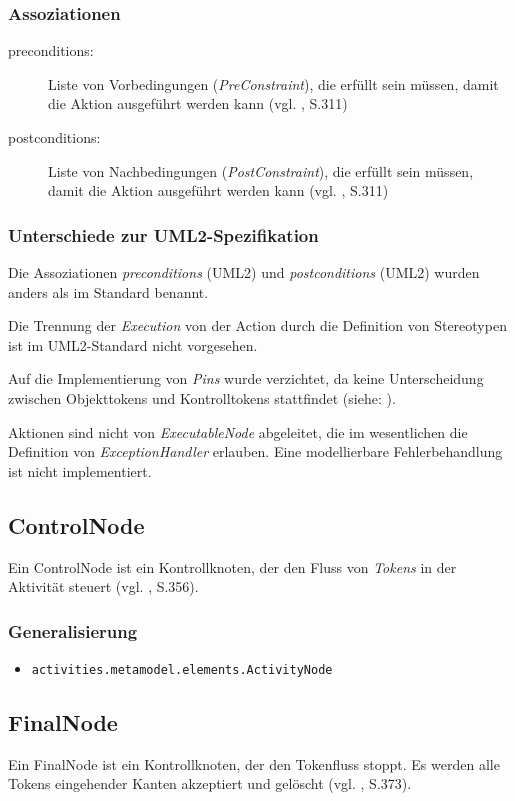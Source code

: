 \subsubsection{Assoziationen}
\begin{description}
\item[preconditions:] Liste von Vorbedingungen (\emph{PreConstraint}), die erfüllt sein müssen, damit die Aktion ausgeführt werden kann (vgl. \citep{OMG2009}, S.311)
\item[postconditions:] Liste von Nachbedingungen (\emph{PostConstraint}), die erfüllt sein müssen, damit  die Aktion ausgeführt werden kann (vgl. \citep{OMG2009}, S.311)
\end{description}

\subsubsection{Unterschiede zur UML2-Spezifikation}
Die Assoziationen \emph{preconditions} (UML2) und \emph{postconditions} (UML2) wurden anders als im Standard benannt.

Die Trennung der \emph{Execution} von der Action durch die Definition von Stereotypen ist im UML2-Standard nicht vorgesehen.

Auf die Implementierung von \emph{Pins} wurde verzichtet, da keine Unterscheidung zwischen Objekttokens und Kontrolltokens stattfindet (siehe: ).

Aktionen sind nicht von \emph{ExecutableNode} abgeleitet, die im wesentlichen die Definition von \emph{ExceptionHandler} erlauben. Eine modellierbare Fehlerbehandlung ist nicht implementiert.


\subsection{ControlNode}
Ein ControlNode ist ein Kontrollknoten, der den Fluss von \emph{Tokens} in der Aktivität steuert (vgl. \citep{OMG2009}, S.356).

\subsubsection{Generalisierung}
\begin{itemize}
\item \texttt{activities.metamodel.elements.ActivityNode}
\end{itemize}


\subsection{FinalNode}
Ein FinalNode ist ein Kontrollknoten, der den Tokenfluss stoppt. Es werden alle Tokens eingehender Kanten akzeptiert und gelöscht (vgl. \citep{OMG2009}, S.373).

